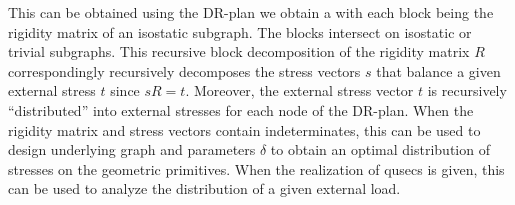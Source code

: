 This can be obtained using the DR-plan we obtain a
with each block being the
rigidity matrix of an isostatic subgraph. The blocks intersect on
isostatic or trivial subgraphs. This recursive block decomposition of
the rigidity matrix $R$ correspondingly recursively decomposes
the stress vectors $s$ that balance a given external stress $t$ since
$sR = t$. Moreover, the external stress vector $t$ is
recursively ``distributed'' into external stresses for each
node of the DR-plan.
When the rigidity matrix and stress
vectors contain indeterminates, this  can be used to design
underlying graph and parameters $\delta$ to obtain an optimal
distribution of stresses on the geometric primitives. When the
realization of qusecs is given, this can be used to analyze the
distribution of a given external load.




